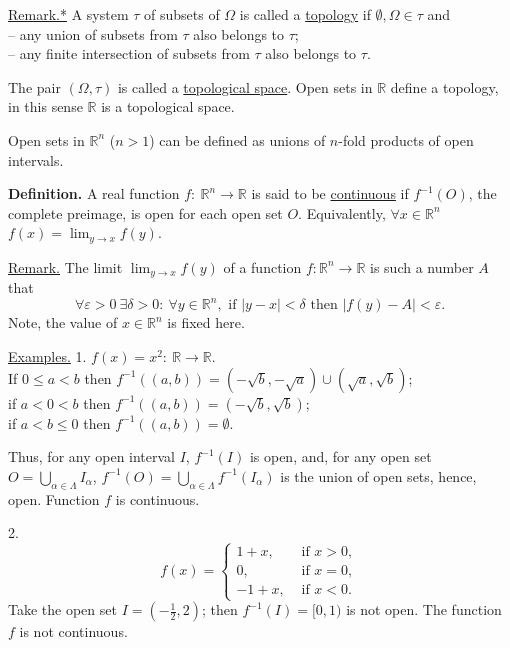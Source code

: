 \documentclass[a4paper,10pt]{article}
\def\RR{\mathbb{R}}
\newcommand{\1}[1]{\mathbf{1}_{\{#1\}}}
\begin{document}
\underline{Remark.*} A system $\tau$ of subsets of $\Omega$ is called a \underline{topology} if $\emptyset,\Omega\in\tau$ and\\
-- any union of subsets from $\tau$ also belongs to $\tau$;\\
-- any finite intersection of subsets from $\tau$ also belongs to $\tau$.

The pair $(\Omega,\tau)$ is called a \underline{topological space}. Open sets in $\RR$ define a topology, in this sense $\RR$ is a topological space.

Open sets in $\RR^n$ ($n>1$) can be defined as unions of $n$-fold products of open intervals.\vspace{3mm}

{\bf Definition.} A real function $f:~\RR^n\to\RR$ is said to be \underline{continuous} if $f^{-1}(O)$, the complete preimage, is open for each open set $O$. Equivalently, $\forall x\in\RR^n$ $f(x)=\lim_{y\to x} f(y)$.\vspace{3mm}

\underline{Remark.} The limit $\lim_{y\to x} f(y)$ of a function $f:\RR^n\to\RR$ is such a number $A$ that
$$\forall\varepsilon>0~\exists\delta>0:~\forall y\in\RR^n, \mbox{ if } |y-x|<\delta \mbox{ then } |f(y)-A|<\varepsilon.$$
Note, the value of $x\in\RR^n$ is fixed here.\vspace{3mm}

\underline{Examples.} 1. $f(x)=x^2:~\RR\to\RR$.\\
If $0\le a<b$ then $f^{-1}((a,b))=(-\sqrt{b},-\sqrt{a})\cup(\sqrt{a},\sqrt{b})$;\\
if $a<0<b$ then $f^{-1}((a,b))=(-\sqrt{b},\sqrt{b})$;\\
if $a<b\le 0$ then $f^{-1}((a,b))=\emptyset$.

Thus, for any open interval $I$, $f^{-1}(I)$ is open, and, for any open set $O=\bigcup_{\alpha\in\Lambda} I_\alpha$, $f^{-1}(O)=\bigcup_{\alpha\in\Lambda} f^{-1}(I_\alpha)$ is the union of open sets, hence, open. Function $f$ is continuous.\vspace{2mm}

2.
$$f(x)=\left\{\begin{array}{rl}
1+x, & \mbox{ if } x>0,\\ 0, & \mbox{ if } x=0,\\ -1+x, & \mbox{ if } x<0. \end{array}\right.$$
Take the open set $I=(-\frac{1}{2},2)$; then $f^{-1}(I)=[0,1)$ is not open. The function $f$ is not continuous.\vspace{3mm}
\end{document}
